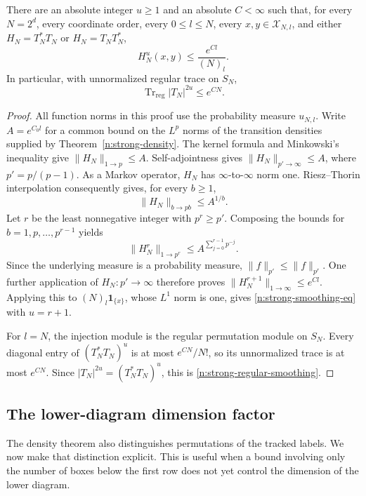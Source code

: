 \begin{corollary}
\label{n:strong-smoothing}
There are an absolute integer $u\ge1$ and an absolute $C<\infty$
such that, for every $N=2^d$, every coordinate order, every
$0\le l\le N$, every $x,y\in\mathcal X_{N,l}$, and either
$H_N=T_N^*T_N$ or $H_N=T_NT_N^*$,
\begin{equation}\label{n:strong-smoothing-eq}
 H_N^u(x,y)\le\frac{e^{Cl}}{(N)_l}.
\end{equation}
In particular, with unnormalized regular trace on $S_N$,
\begin{equation}\label{n:strong-regular-smoothing}
 \operatorname{Tr}_{\mathrm{reg}}|T_N|^{2u}\le e^{CN}.
\end{equation}
\end{corollary}

\begin{proof}
All function norms in this proof use the probability measure
$u_{N,l}$.  Write $A=e^{C_0l}$ for a common bound on the $L^p$
norms of the transition densities supplied by
Theorem~\ref{n:strong-density}.  The kernel formula and Minkowski's
inequality give $\|H_N\|_{1\to p}\le A$.  Self-adjointness gives
$\|H_N\|_{p'\to\infty}\le A$, where $p'=p/(p-1)$.
As a Markov operator, $H_N$ has $\infty$-to-$\infty$ norm one.
Riesz--Thorin interpolation consequently gives, for every $b\ge1$,
\[
 \|H_N\|_{b\to pb}\le A^{1/b}.
\]
Let $r$ be the least nonnegative integer with $p^r\ge p'$.
Composing the bounds for $b=1,p,\ldots,p^{r-1}$ yields
\[
 \|H_N^r\|_{1\to p^r}
 \le A^{\sum_{j=0}^{r-1}p^{-j}}.
\]
Since the underlying measure is a probability measure,
$\|f\|_{p'}\le\|f\|_{p^r}$.  One further application of
$H_N:p'\to\infty$ therefore proves
$\|H_N^{r+1}\|_{1\to\infty}\le e^{Cl}$.
Applying this to $(N)_l\mathbf1_{\{x\}}$, whose $L^1$ norm is
one, gives \eqref{n:strong-smoothing-eq} with $u=r+1$.

For $l=N$, the injection module is the regular permutation module
on $S_N$.  Every diagonal entry of $(T_N^*T_N)^u$ is at most
$e^{CN}/N!$, so its unnormalized trace is at most $e^{CN}$.
Since $|T_N|^{2u}=(T_N^*T_N)^u$, this is
\eqref{n:strong-regular-smoothing}.
\end{proof}

\subsection{The lower-diagram dimension factor}

The density theorem also distinguishes permutations of the tracked
labels.  We now make that distinction explicit.  This is useful
when a bound involving only the number of boxes below the first row
does not yet control the dimension of the lower diagram.

